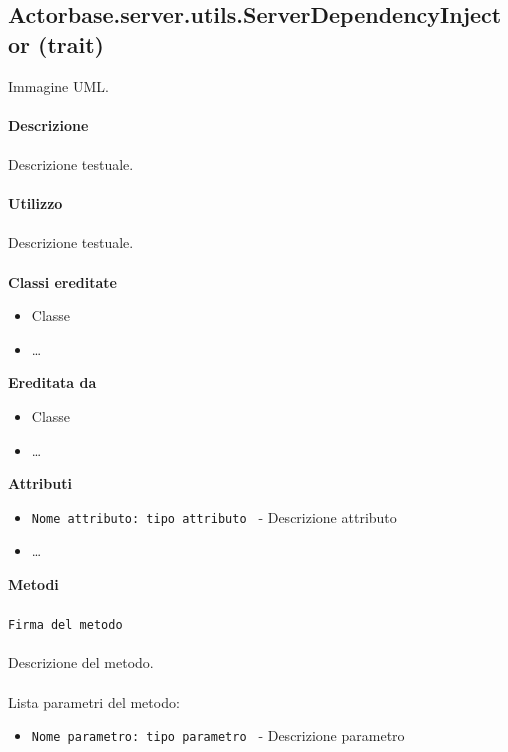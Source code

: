 \documentclass[a4paper]{article}
\begin{document}
	\subsection{Actorbase.server.utils.ServerDependencyInjector (trait)}
		Immagine UML.
		\\ \\
		\textbf{Descrizione}
			\\ \\
			Descrizione testuale.
			\\ \\
		\textbf{Utilizzo}
			\\ \\
			Descrizione testuale.
			\\ \\
		\textbf{Classi ereditate}
			\begin{itemize}
				\item Classe
				\item \dots
			\end{itemize}
		\textbf{Ereditata da}
			\begin{itemize}
				\item Classe
				\item \dots
			\end{itemize}
		\textbf{Attributi}
			\begin{itemize}
				\item \texttt{Nome attributo: tipo attributo } - Descrizione attributo
				\item \dots
			\end{itemize}
		\textbf{Metodi}
			\\ \\
			\texttt{Firma del metodo}
			\\ \\
			Descrizione del metodo.
			\\ \\
			Lista parametri del metodo:
			\begin{itemize}
				\item \texttt{Nome parametro: tipo parametro } - Descrizione parametro
			\end{itemize}
			
\end{document}
